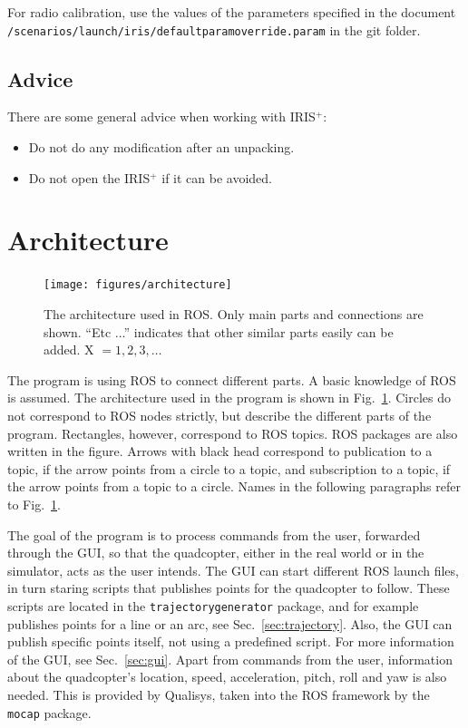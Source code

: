\documentclass[titlepage,11pt,a4paper]{article}
\begin{document}
For radio calibration, use the values of the parameters specified in the document \texttt{/scenarios/launch/iris/default\textunderscore param\textunderscore override.param} in the git folder.

\subsection{Advice}
\label{subsec:advice}
There are some general advice when working with IRIS$^+$:

\begin{itemize}
  \item Do not do any modification after an unpacking.
  \item Do not open the IRIS$^+$ if it can be avoided.
\end{itemize}


\section{Architecture}
\label{sec:architecture}

\begin{figure}[h!]                                                               
  \centering \texttt{[image: figures/architecture]}
  \caption{The architecture used in ROS. Only main parts and
    connections are shown. ``Etc ...'' indicates that other similar
    parts easily can be added. X $= 1, 2, 3, \dots$}
  \label{fig:architecture}                                                              
\end{figure}

The program is using ROS to connect different parts. A basic knowledge
of ROS is assumed. The architecture used in the program is shown in
Fig.~\ref{fig:architecture}. Circles do not correspond to ROS nodes
strictly, but describe the different parts of the program. Rectangles,
however, correspond to ROS topics. ROS packages are also written in
the figure. Arrows with black head correspond to publication to a
topic, if the arrow points from a circle to a topic, and subscription
to a topic, if the arrow points from a topic to a circle. Names in the
following paragraphs refer to Fig.~\ref{fig:architecture}.

The goal of the program is to process commands from the user,
forwarded through the GUI, so that the quadcopter, either in the real
world or in the simulator, acts as the user intends. The GUI can start
different ROS launch files, in turn staring scripts that publishes
points for the quadcopter to follow. These scripts are located in the
\texttt{trajectory\textunderscore generator} package, and for example
publishes points for a line or an arc, see
Sec.~\ref{sec:trajectory}. Also, the GUI can publish specific points
itself, not using a predefined script. For more information of the
GUI, see Sec.~\ref{sec:gui}. Apart from commands from the user,
information about the quadcopter's location, speed, acceleration,
pitch, roll and yaw is also needed. This is provided by Qualisys,
taken into the ROS framework by the \texttt{mocap} package.
\end{document}
